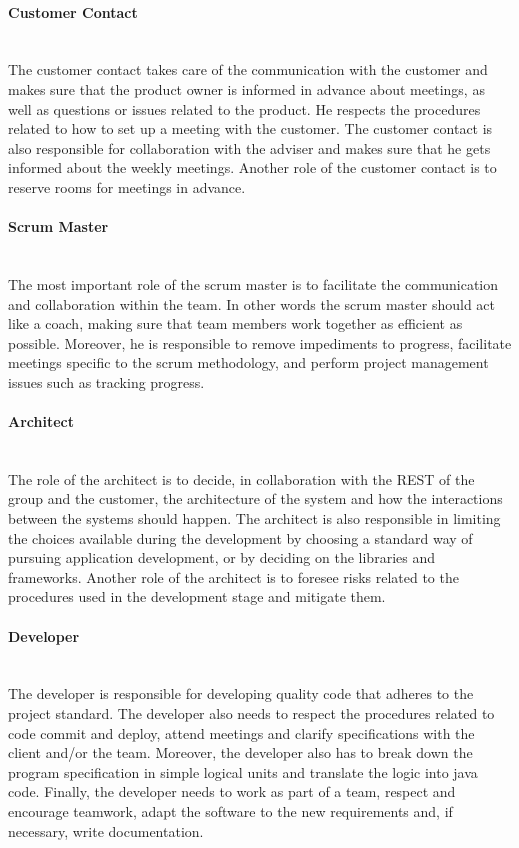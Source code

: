 \documentclass[../document.tex]{subfiles}
\begin{document}
\paragraph{Customer Contact} \ \\
The customer contact takes care of the communication with the customer and makes sure that the product owner is informed in advance about meetings, as well as questions or issues related to the product. He respects the procedures related to how to set up a meeting with the customer. The customer contact is also responsible for collaboration with the adviser and makes sure that he gets informed about the weekly meetings. Another role of the customer contact is to reserve rooms for meetings in advance.

\paragraph{Scrum Master} \ \\
The most important role of the scrum master is to facilitate the communication and collaboration within the team. In other words the scrum master should act like a coach, making sure that team members work together as efficient as possible. Moreover, he is responsible to remove impediments to progress, facilitate meetings specific to the scrum methodology, and perform project management issues such as tracking progress. 

\paragraph{Architect} \ \\
The role of the architect is to decide, in collaboration with the \gls{REST} of the group and the customer, the architecture of the system and how the interactions between the systems should happen. The architect is also responsible in limiting the choices available during the development by choosing a standard way of pursuing application development, or by deciding on the libraries and frameworks. Another role of the architect is to foresee risks related to the procedures used in the development stage and mitigate them. 

\paragraph{Developer} \ \\
The developer is responsible for developing quality code that adheres to the project standard. The developer also needs to respect the procedures related to code commit and deploy, attend meetings and clarify specifications with the client and/or the team. Moreover, the developer also has to break down the program specification in simple logical units and translate the logic into java code. Finally, the developer needs to work as part of a team, respect and encourage teamwork, adapt the software to the new requirements and, if necessary, write documentation.
\end{document}
